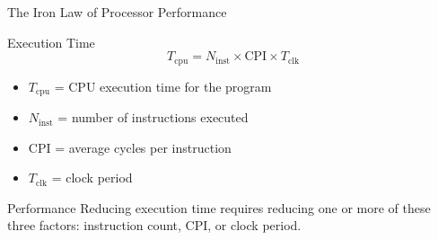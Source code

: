 \documentclass[aspectratio=169,11pt,t]{beamer}
\begin{document}

\begin{frame}{The Iron Law of Processor Performance}

\begin{block}{Execution Time}
\[
T_{\mathrm{cpu}}
=
N_{\mathrm{inst}}
\times
\mathrm{CPI}
\times
T_{\mathrm{clk}}
\]
\end{block}

\vspace{0.2cm}

\begin{itemize}\setlength{\itemsep}{6pt}
  \item $T_{\mathrm{cpu}}$ = CPU execution time for the program
  \item $N_{\mathrm{inst}}$ = number of instructions executed
  \item $\mathrm{CPI}$ = average cycles per instruction
  \item $T_{\mathrm{clk}}$ = clock period
\end{itemize}

\vspace{0.2cm}

\begin{block}{Performance}
Reducing execution time requires reducing one or more of these three factors:
instruction count, CPI, or clock period.
\end{block}

\end{frame}


\end{document}
